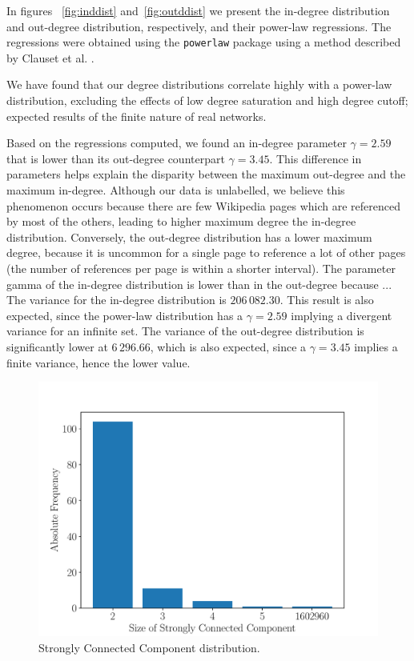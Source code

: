 \documentclass[9pt,a4paper,twocolumn]{article}
\begin{document}
In figures ~\ref{fig:inddist} and~\ref{fig:outddist} we present the in-degree distribution and out-degree distribution, respectively, and their power-law regressions. The regressions were obtained using the \texttt{powerlaw} package \cite{alstott_bullmore_plenz_2014} using a method described by Clauset et al. \cite{Clauset2009}.

We have found that our degree distributions correlate highly with a power-law distribution, excluding the effects of low degree saturation and high degree cutoff; expected results of the finite nature of real networks.

Based on the regressions computed, we found an in-degree parameter $\gamma = 2.59$ that is lower than its out-degree counterpart $\gamma = 3.45$. This difference in parameters helps explain the disparity between the maximum out-degree and the maximum in-degree. Although our data is unlabelled, we believe this phenomenon occurs because there are few Wikipedia pages which are referenced by most of the others, leading to higher maximum degree the in-degree distribution. Conversely, the out-degree distribution has a lower maximum degree, because it is uncommon for a single page to reference a lot of other pages (the number of references per page is within a shorter interval). The parameter gamma of the in-degree distribution is lower than in the out-degree because ... %
The variance for the in-degree distribution is $206\,082.30$. This result is also expected, since the power-law distribution has a $\gamma = 2.59$ implying a divergent variance for an infinite set. The variance of the out-degree distribution is significantly lower at $6\,296.66$, which is also expected, since a $\gamma = 3.45$ implies a finite variance, hence the lower value.

\begin{figure}[h]
	\centering
	\includegraphics[width=\linewidth]{wikipedia_pt_sccdistr.pdf}
	\caption{Strongly Connected Component distribution.}
	\label{fig:sccdist}
\end{figure}
\end{document}
